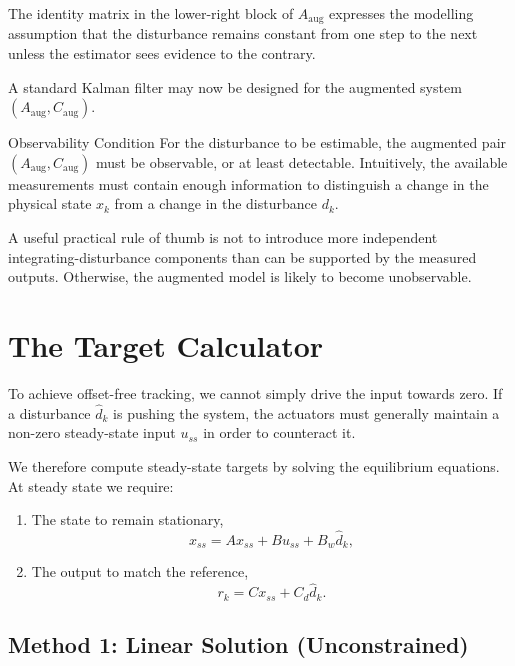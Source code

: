 The identity matrix in the lower-right block of \(A_{\mathrm{aug}}\) expresses the modelling assumption that the disturbance remains constant from one step to the next unless the estimator sees evidence to the contrary.

A standard Kalman filter may now be designed for the augmented system \((A_{\mathrm{aug}}, C_{\mathrm{aug}})\). 

\begin{alertbox}{Observability Condition}
	For the disturbance to be estimable, the augmented pair \((A_{\mathrm{aug}}, C_{\mathrm{aug}})\) must be observable, or at least detectable. Intuitively, the available measurements must contain enough information to distinguish a change in the physical state \(x_k\) from a change in the disturbance \(d_k\).
	
	A useful practical rule of thumb is not to introduce more independent integrating-disturbance components than can be supported by the measured outputs. Otherwise, the augmented model is likely to become unobservable.
\end{alertbox}

\section{The Target Calculator}

To achieve offset-free tracking, we cannot simply drive the input towards zero. If a disturbance \(\hat d_k\) is pushing the system, the actuators must generally maintain a non-zero steady-state input \(u_{ss}\) in order to counteract it.

We therefore compute steady-state targets by solving the equilibrium equations. At steady state we require:
\begin{enumerate}
	\item The state to remain stationary,
	\[
	x_{ss} = A x_{ss} + B u_{ss} + B_w \hat d_k,
	\]
	\item The output to match the reference,
	\[
	r_k = C x_{ss} + C_d \hat d_k.
	\]
\end{enumerate}

\subsection{Method 1: Linear Solution (Unconstrained)}

